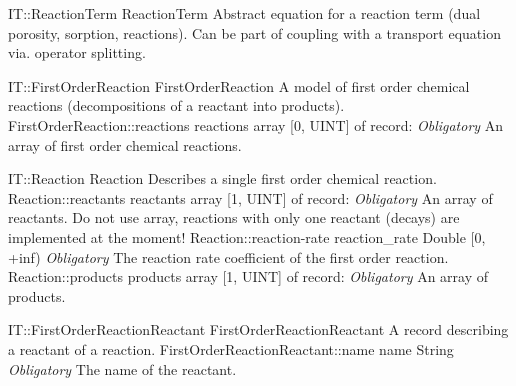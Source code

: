 \begin{AbstractType}
	{IT::ReactionTerm}
	{ReactionTerm}
	{}
	{{{Abstract equation for a reaction term (dual porosity, sorption, reactions). Can be part of coupling with a transport equation via. operator splitting.}%
}}
\end{AbstractType}
\begin{RecordType}
	{IT::FirstOrderReaction}
	{FirstOrderReaction}
	{}%
	{}%
	{{{A model of first order chemical reactions (decompositions of a reactant into products).}%
}}
		\RecKey
			{FirstOrderReaction::reactions}
			{reactions}
			{{array [0, UINT] of }{record: }}{}
			{ \it{Obligatory}}
			{{{An array of first order chemical reactions.}%
}}
\end{RecordType}
\begin{RecordType}
	{IT::Reaction}
	{Reaction}
	{}%
	{}%
	{{{Describes a single first order chemical reaction.}%
}}
		\RecKey
			{Reaction::reactants}
			{reactants}
			{{array [1, UINT] of }{record: }}{}
			{ \it{Obligatory}}
			{{{An array of reactants.
Do not use array, reactions with only one reactant (decays) are implemented at the moment!}%
}}
		\RecKey
			{Reaction::reaction-rate}
			{reaction{\_}rate}
			{{Double [0, +inf)}}{}
			{ \it{Obligatory}}
			{{{The reaction rate coefficient of the first order reaction.}%
}}
		\RecKey
			{Reaction::products}
			{products}
			{{array [1, UINT] of }{record: }}{}
			{ \it{Obligatory}}
			{{{An array of products.}%
}}
\end{RecordType}
\begin{RecordType}
	{IT::FirstOrderReactionReactant}
	{FirstOrderReactionReactant}
	{}%
	{}%
	{{{A record describing a reactant of a reaction.}%
}}
		\RecKey
			{FirstOrderReactionReactant::name}
			{name}
			{{String}}{}
			{ \it{Obligatory}}
			{{{The name of the reactant.}%
}}
\end{RecordType}
